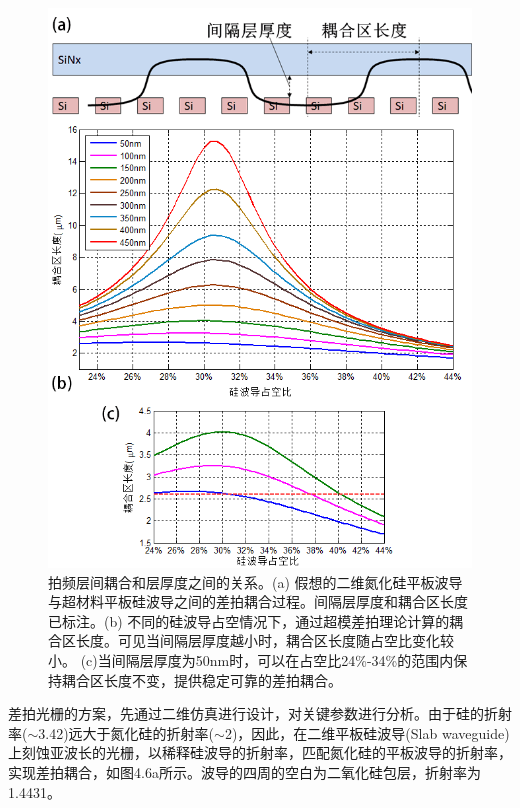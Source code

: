 \begin{figure}[!htbp]
    \centering
    \includegraphics[width=1\textwidth]{Img/4-6.png}
    \caption{拍频层间耦合和层厚度之间的关系。(a) 假想的二维氮化硅平板波导与超材料平板硅波导之间的差拍耦合过程。间隔层厚度和耦合区长度已标注。(b) 不同的硅波导占空情况下，通过超模差拍理论计算的耦合区长度。可见当间隔层厚度越小时，耦合区长度随占空比变化较小。 (c)当间隔层厚度为50nm时，可以在占空比24\%-34\%的范围内保持耦合区长度不变，提供稳定可靠的差拍耦合。}
    \label{fig:4-6}
\end{figure}

差拍光栅的方案，先通过二维仿真进行设计，对关键参数进行分析。由于硅的折射率($\sim$3.42)远大于氮化硅的折射率($\sim$2)，因此，在二维平板硅波导(Slab waveguide)上刻蚀亚波长的光栅，以稀释硅波导的折射率，匹配氮化硅的平板波导的折射率，实现差拍耦合，如图4.6a所示。波导的四周的空白为二氧化硅包层，折射率为1.4431。

